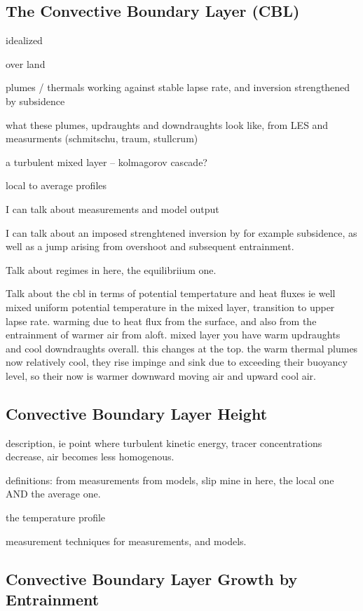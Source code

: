 \subsection{The Convective Boundary Layer (CBL)}
idealized

over land

plumes / thermals working against stable lapse rate, and inversion strengthened by subsidence

what these plumes, updraughts and downdraughts look like, from LES and measurments (schmitschu, traum, stullcrum)

a turbulent mixed layer -- kolmagorov cascade?

local to average profiles

I can talk about measurements and model output

I can talk about an imposed strenghtened inversion by for example subsidence, as well as a jump arising
from overshoot and subsequent entrainment.

Talk about regimes in here, the equilibriium one.

Talk about the cbl in terms of potential tempertature and heat fluxes ie well mixed uniform potential temperature in
the mixed layer, transition to upper lapse rate.  warming due to heat flux from the surface, and also from the entrainment
of warmer air from aloft. mixed layer you have warm updraughts and cool downdraughts overall.  this changes at the top.
the warm thermal plumes now relatively cool, they rise impinge and sink due to exceeding their buoyancy level, so their
now is warmer downward moving air and upward cool air.

\subsection{Convective Boundary Layer Height}
\label{subsec:}

description, ie point where turbulent kinetic energy, tracer concentrations decrease, air becomes less homogenous.

definitions: from measurements from models, slip mine in here, the local one AND the average one. 

the temperature profile

measurement techniques for measurements, and models.

\subsection{Convective Boundary Layer Growth by Entrainment}
\label{subsec:}


